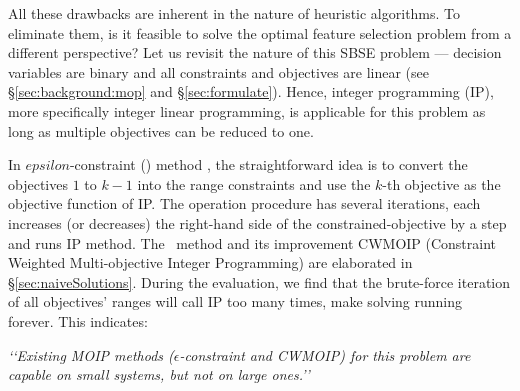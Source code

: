 All these drawbacks are inherent in the nature of heuristic algorithms. To eliminate them, is it feasible to solve the optimal feature selection problem from a different perspective?
Let us revisit the nature of this SBSE problem --- decision variables are binary and all constraints and objectives are linear  (see  \S\ref{sec:background:mop} and \S\ref{sec:formulate}). Hence, integer programming (IP), more specifically integer linear programming, is applicable for this problem as long as  multiple objectives can be reduced to one.


In $epsilon$-constraint (\naiveSol) method \cite{e-constraint}, the straightforward idea is to convert the objectives $1$ to $k-1$ into the range constraints and use the $k$-th objective as the objective function of IP. The operation procedure has several iterations, each increases (or decreases) the right-hand side of the constrained-objective by a step and runs IP method. The \naiveSol~method and its improvement CWMOIP (Constraint Weighted Multi-objective Integer Programming) \cite{DBLP:journals/eor/OzlenA09} are elaborated in \S\ref{sec:naiveSolutions}. %
During the evaluation, we find that the brute-force iteration of all objectives' ranges will call IP too many times, make solving running forever. This indicates:
 
\begin{center}
 \emph{\lq\lq{}Existing MOIP methods ($\epsilon$-constraint and CWMOIP) for this problem are capable on small systems, but not on large ones.\rq\rq}
\end{center}
 
